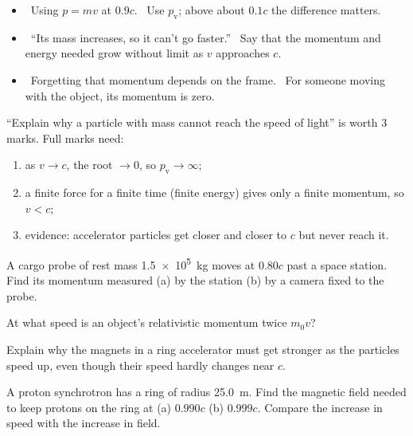 \begin{mistakes}
\begin{itemize}
  \item \xmark\ Using $p = mv$ at $0.9c$. \cmark\ Use $p_\mathrm{v}$; above about $0.1c$ the
        difference matters.
  \item \xmark\ ``Its mass increases, so it can't go faster.'' \cmark\ Say that the momentum and
        energy needed grow without limit as $v$ approaches $c$.
  \item \xmark\ Forgetting that momentum depends on the frame. \cmark\ For someone moving with the
        object, its momentum is zero.
\end{itemize}
\end{mistakes}

\begin{examtip}
``Explain why a particle with mass cannot reach the speed of light'' is worth 3 marks. Full
marks need:
\begin{enumerate}
  \item as $v \to c$, the root $\to 0$, so $p_\mathrm{v} \to \infty$;
  \item a finite force for a finite time (finite energy) gives only a finite momentum, so
        $v < c$;
  \item evidence: accelerator particles get closer and closer to $c$ but never reach it.
\end{enumerate}
\end{examtip}

\begin{quickcheck}
  \item A cargo probe of rest mass \qty{1.5e5}{kg} moves at $0.80c$ past a space station. Find
        its momentum measured (a) by the station (b) by a camera fixed to the probe.
  \item At what speed is an object's relativistic momentum twice $m_0v$?
  \item Explain why the magnets in a ring accelerator must get stronger as the particles speed up,
        even though their speed hardly changes near $c$.
  \item A proton synchrotron has a ring of radius \qty{25.0}{m}. Find the magnetic field needed
        to keep protons on the ring at (a) $0.990c$ (b) $0.999c$. Compare the increase in speed
        with the increase in field.\label{ch4:qc:ring}
\end{quickcheck}

